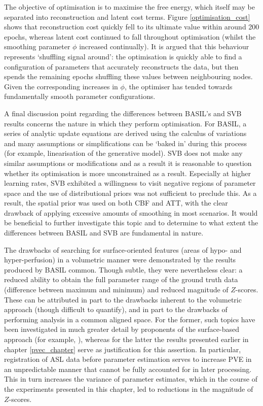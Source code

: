The objective of optimisation is to maximise the free energy, which itself may be separated into reconstruction and latent cost terms. Figure \ref{optimisation_cost} shows that reconstruction cost quickly fell to its ultimate value within around 200 epochs, whereas latent cost continued to fall throughout optimisation (whilst the smoothing parameter $\phi$ increased continually). It is argued that this behaviour represents `shuffling signal around': the optimisation is quickly able to find a configuration of parameters that accurately reconstructs the data, but then spends the remaining epochs shuffling these values between neighbouring nodes. Given the corresponding increases in $\phi$, the optimiser has tended towards fundamentally smooth parameter configurations. 

A final discussion point regarding the differences between BASIL's and SVB results concerns the nature in which they perform optimisation. For BASIL, a series of analytic update equations are derived using the calculus of variations and many assumptions or simplifications can be `baked in' during this process (for example, linearisation of the generative model). SVB does not make any similar assumptions or modifications and as a result it is reasonable to question whether its optimisation is more unconstrained as a result. Especially at higher learning rates, SVB exhibited a willingness to visit negative regions of parameter space and the use of distributional priors was not sufficient to preclude this. As a result, the spatial prior was used on both CBF and ATT, with the clear drawback of applying excessive amounts of smoothing in most scenarios. It would be beneficial to further investigate this topic and to determine to what extent the differences between BASIL and SVB are fundamental in nature. 

The drawbacks of searching for surface-oriented features (areas of hypo- and hyper-perfusion) in a volumetric manner were demonstrated by the results produced by BASIL common. Though subtle, they were nevertheless clear: a reduced ability to obtain the full parameter range of the ground truth data (difference between maximum and minimum) and reduced magnitude of $Z$-scores. These can be attributed in part to the drawbacks inherent to the volumetric approach (though difficult to quantify), and in part to the drawbacks of performing analysis in a common aligned space. For the former, such topics have been investigated in much greater detail by proponents of the surface-based approach (for example, \cite{Coalson2017}), whereas for the latter the results presented earlier in chapter \ref{pvec_chapter} serve as justification for this assertion. In particular, registration of ASL data before parameter estimation serves to increase PVE in an unpredictable manner that cannot be fully accounted for in later processing. This in turn increases the variance of parameter estimates, which in the course of the experiments presented in this chapter, led to reductions in the magnitude of $Z$-scores. 


